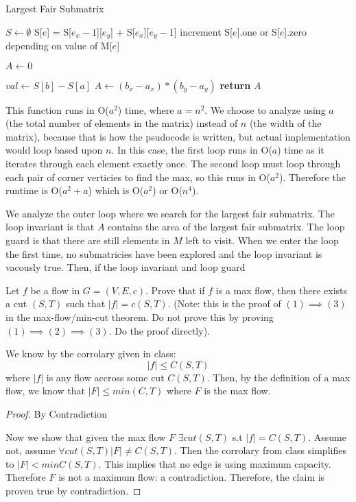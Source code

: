 \documentclass{article}
\begin{document}
\begin{algorithm}
\caption{Largest Fair Submatrix}\label{guests}
\begin{algorithmic}[1]
\State $S \gets \emptyset$
\State S[$e$] = S[$e_x - 1$][$e_y$] + S[$e_x$][$e_y - 1$]
\State increment S[$e$].one or S[$e$].zero depending on value of M[$e$]
\EndFor
\EndFor

$A \gets 0$

\State $val \gets S[b] - S[a]$
\State $A \gets (b_x - a_x) * (b_y - a_y)$
\EndIf
\EndIf
\EndFor
\EndFor
\State \textbf{return} $A$
\EndFunction
\end{algorithmic}
\end{algorithm}

This function runs in O($a^2$) time, where $a = n^2$. We choose to analyze using $a$ (the total number of elements in the matrix) instead of $n$ (the width of the matrix),
because that is how the psudocode is written, but actual implementation would loop based upon $n$.
In this case, the first loop runs in O($a$) time as it iterates through each element exactly once.
The second loop must loop through each pair of corner verticies to find the max,
so this runs in O($a^2$). Therefore the runtime is O($a^2 + a$) which is O($a^2$) or O($n^4$).

We analyze the outer loop where we search for the largest fair submatrix. The loop invariant is that $A$ contains the area of the largest fair submatrix.
The loop guard is that there are still elements in $M$ left to visit. When we enter the loop the first time,
no submatricies have been explored and the loop invariant is vacously true. Then,
if the loop invariant and loop guard

\nextprob
Let $f$ be a flow in $G=(V,E,c)$.  Prove that if $f$ is a max flow, then there
exists a cut $(S,T)$ such that $|f| = c(S,T)$.  (Note: this is the proof of $(1)
\implies (3)$ in the max-flow/min-cut theorem.  Do not prove this by proving
$(1) \implies (2) \implies (3)$.  Do the proof directly).

We know by the corrolary given in class:
$$\left | f \right | \leq C(S,T)$$
where $\left | f \right |$ is any flow accross some cut $C(S,T)$.
Then, by the definition of a max flow, we know that $\left | F \right | \leq min(C,
T)$ where $F$ is the max flow.

\begin{proof} By Contradiction

Now we show that given the max flow $F$ $\exists cut(S,T)$ s.t $\left | f \right | = C(S,
T)$. Assume not, assume $\forall cut(S,T) \left | F \right | \neq C(S,T)$. Then the corrolary from class simplifies to $\left | F \right | < min C(S,
T)$. This implies that no edge is using maximum capacity. Therefore $F$ is not a maximum flow: a contradiction.
Therefore, the claim is proven true by contradiction.
\end{proof}
\end{document}
